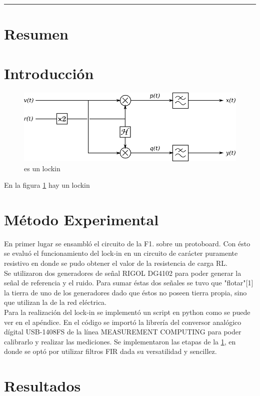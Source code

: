 \documentclass[11pt,a4paper]{extarticle}
\begin{document}
\hrule
\begin{multicols}{2}
\normalsize
\section{Resumen}

\section{Introducción}

\begin{figure}[H]
	\centering
	\includegraphics[width=\linewidth]{Images/lockin.eps}
	\caption{es un lockin}
	\label{fig:lockin}
\end{figure}


En la figura \ref{fig:lockin} hay un lockin

\section{Método Experimental}
En primer lugar se ensambló el circuito de la F1. sobre 
un protoboard. Con ésto se evaluó el funcionamiento del
lock-in en un circuito de carácter puramente resistivo 
en donde se pudo obtener el valor de la resistencia 
de carga RL.\\
Se utilizaron dos generadores de señal RIGOL DG4102 
para poder generar la señal de referencia y el ruido.
Para sumar éstas dos señales se tuvo que "flotar"[1] la 
tierra de uno de los generadores dado que éstos no poseen 
tierra propia, sino que utilizan la de la red eléctrica.\\

Para la realización del lock-in se implementó un 
script en python como se puede ver en el apéndice.
En el código se importó la librería del 
conversor analógico dígital USB-1408FS de la línea 
MEASUREMENT COMPUTING para poder 
calibrarlo y realizar las mediciones. Se implementaron 
las etapas de la \ref{fig:lockin}, en donde se optó 
por utilizar filtros FIR dada su versatilidad y sencillez.

\section{Resultados}


\end{multicols}
\end{document}
